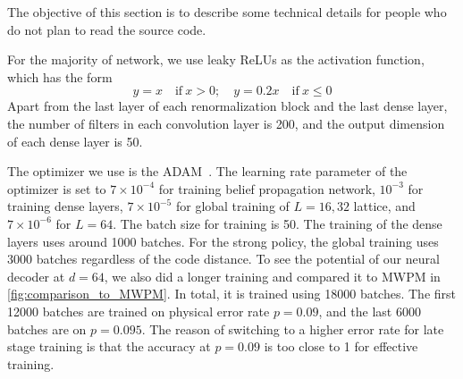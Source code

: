 The objective of this section is to describe some technical details for people who do not plan to read the source code.

For the majority of network, we use leaky ReLUs as the activation function, which has the form
\begin{equation}
y=x \quad \text{if} \  x>0; \quad y=0.2x \quad \text{if} \  x\leq0
\end{equation}
Apart from the last layer of each renormalization block and the last dense layer, the number of filters in each convolution layer is 200, and the output dimension of each dense layer is 50.

The optimizer we use is the ADAM~\cite{kingma2014adam}.
The learning rate parameter of the optimizer is set to $7\times 10^{-4}$ for training belief propagation network, $10^{-3}$ for training dense layers, $7\times 10^{-5}$ for global training of $L=16,32$ lattice, and $7\times 10^{-6}$ for $L=64$.
The batch size for training is 50.
The training of the dense layers uses around 1000 batches.
For the strong policy, the global training uses 3000 batches regardless of the code distance.
To see the potential of our neural decoder at $d=64$, we also did a longer training and compared it to MWPM in \autoref{fig:comparison_to_MWPM}.
In total, it is trained using 18000 batches.
The first 12000 batches are trained on physical error rate $p=0.09$, and the last 6000 batches are on $p=0.095$.
The reason of switching to a higher error rate for late stage training is that the accuracy at $p=0.09$ is too close to 1 for effective training.




